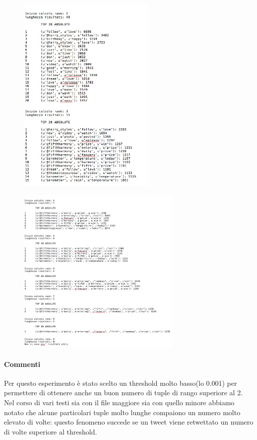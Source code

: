 \documentclass{article}
\begin{document}
\newpage
\begin{figure}[h]
  \begin{center}
  \includegraphics[width=250px]{2code.jpeg}
  \end{center}
\end{figure}

\newpage
\begin{figure}[h]
  \begin{center}
  \includegraphics[width=300px]{3code.jpg}
  \end{center}
\end{figure}



\paragraph{Commenti}
Per questo esperimento è stato scelto un threshold molto basso(lo 0.001) per permettere di ottenere anche un buon numero di tuple di rango superiore al 2.\\
Nel corso di vari testi sia con il file maggiore sia con quello minore abbiamo notato che alcune particolari tuple molto lunghe compaiono un numero molto elevato di volte: questo fenomeno succede se un tweet viene retwettato un numero di volte superiore al threshold.
\newpage
\end{document}
